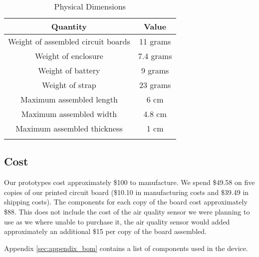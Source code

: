 \begin{longtable}{ c | c }
\toprule
Quantity & Value \\
\midrule
Weight of assembled circuit boards & 11 grams \\
Weight of enclosure & 7.4 grams \\
Weight of battery & 9 grams \\
Weight of strap & 23 grams \\
Maximum assembled length & 6 cm \\
Maximum assembled width & 4.8 cm \\
Maximum assembled thickness & 1 cm \\
\bottomrule

\caption{Physical Dimensions}
\label{table:physical-dimensions}
\end{longtable}


\subsection{Cost}

Our prototypes cost approximately \$100 to manufacture. We spend \$49.58 on
five copies of our printed circuit board (\$10.10 in manufacturing costs and
\$39.49 in shipping costs). The components for each copy of the board cost
approximately \$88. This does not include the cost of the air quality sensor we 
were planning to use as we where unable to purchase it, the air quality sensor
would added approximately an additional \$15 per copy of the board assembled.

Appendix \ref{sec:appendix_bom} contains a list of components used in the
device.

